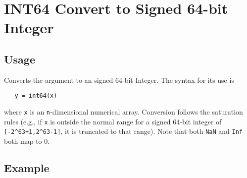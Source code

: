 \section{INT64 Convert to Signed 64-bit Integer}

\subsection{Usage}

Converts the argument to an signed 64-bit Integer.  The syntax
for its use is
\begin{verbatim}
   y = int64(x)
\end{verbatim}
where \verb|x| is an \verb|n|-dimensional numerical array.  Conversion
follows the saturation rules (e.g., if \verb|x| is outside the normal
range for a signed 64-bit integer of \verb|[-2^63+1,2^63-1]|, it is
truncated to that range).  Note that both \verb|NaN| and \verb|Inf| both map to 0.
\subsection{Example}

